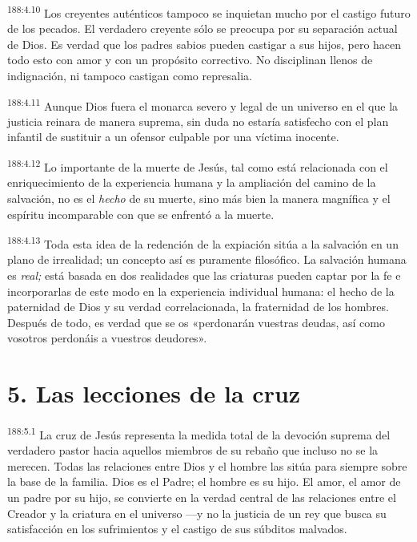 \par 
\textsuperscript{188:4.10} Los creyentes auténticos tampoco se inquietan mucho por el castigo futuro de los pecados. El verdadero creyente sólo se preocupa por su separación actual de Dios. Es verdad que los padres sabios pueden castigar a sus hijos, pero hacen todo esto con amor y con un propósito correctivo. No disciplinan llenos de indignación, ni tampoco castigan como represalia.

\par 
\textsuperscript{188:4.11} Aunque Dios fuera el monarca severo y legal de un universo en el que la justicia reinara de manera suprema, sin duda no estaría satisfecho con el plan infantil de sustituir a un ofensor culpable por una víctima inocente.

\par 
\textsuperscript{188:4.12} Lo importante de la muerte de Jesús, tal como está relacionada con el enriquecimiento de la experiencia humana y la ampliación del camino de la salvación, no es el \textit{hecho} de su muerte, sino más bien la manera magnífica y el espíritu incomparable con que se enfrentó a la muerte.

\par 
\textsuperscript{188:4.13} Toda esta idea de la redención de la expiación sitúa a la salvación en un plano de irrealidad; un concepto así es puramente filosófico. La salvación humana es \textit{real;} está basada en dos realidades que las criaturas pueden captar por la fe e incorporarlas de este modo en la experiencia individual humana: el hecho de la paternidad de Dios y su verdad correlacionada, la fraternidad de los hombres. Después de todo, es verdad que se os «perdonarán vuestras deudas, así como vosotros perdonáis a vuestros deudores».

\section*{5. Las lecciones de la cruz}
\par 
\textsuperscript{188:5.1} La cruz de Jesús representa la medida total de la devoción suprema del verdadero pastor hacia aquellos miembros de su rebaño que incluso no se la merecen. Todas las relaciones entre Dios y el hombre las sitúa para siempre sobre la base de la familia. Dios es el Padre; el hombre es su hijo. El amor, el amor de un padre por su hijo, se convierte en la verdad central de las relaciones entre el Creador y la criatura en el universo ---y no la justicia de un rey que busca su satisfacción en los sufrimientos y el castigo de sus súbditos malvados.

